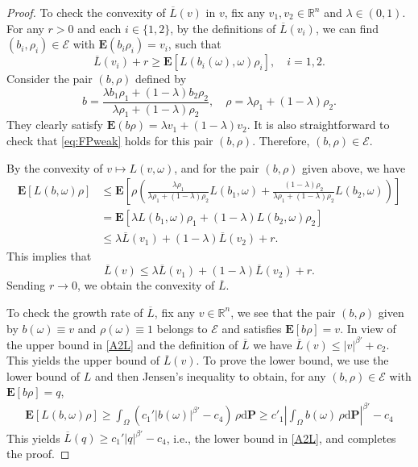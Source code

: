 \documentclass[11pt,reqno]{amsart}
\theoremstyle{definition}
\theoremstyle{remark}
\numberwithin{equation}{section}
\newcommand{\R}{{\mathbb{R}}}
\newcommand{\ol}{\overline}
\begin{document}
\begin{proof} To check the convexity of $\overline{L}(v)$ in $v$, fix any $v_1,v_2\in \R^n$ and $\lambda\in (0,1)$. For any $r>0$ and each $i\in \{1,2\}$, by the definitions of $\ol{L}(v_i)$, we can find $(b_i,\rho_i) \in \mathscr{E}$ with $\mathbf{E}(b_i\rho_i) = v_i$, such that
\begin{equation*}
    \overline{L}(v_i) + r\ge \mathbf{E}[L(b_i(\omega),\omega)\rho_i], \quad i=1,2.
\end{equation*}
Consider the pair $(b,\rho)$ defined by
\begin{equation*}
b=\frac{\lambda b_1\rho_1 + (1-\lambda) b_2\rho_2}{\lambda \rho_1 + (1-\lambda)\rho_2}, \quad \rho = \lambda \rho_1 + (1-\lambda) \rho_2.
\end{equation*}
They clearly satisfy $\mathbf{E}(b\rho) = \lambda v_1 + (1-\lambda) v_2$. It is also straightforward to check that \eqref{eq:FPweak} holds for this pair $(b,\rho)$. Therefore, $(b,\rho) \in \mathscr{E}$.

By the convexity of $v\mapsto L(v,\omega)$, and for the pair $(b,\rho)$ given above, we have
\begin{equation*}
    \begin{aligned}
    \mathbf{E}[L(b,\omega)\rho] &\le \mathbf{E}\left[\rho\left(\frac{\lambda \rho_1}{\lambda \rho_1 + (1-\lambda)\rho_2}L(b_1,\omega) + \frac{(1-\lambda) \rho_2}{\lambda \rho_1 + (1-\lambda)\rho_2}L(b_2,\omega)\right)\right]\\
    &=\mathbf{E}[\lambda L(b_1,\omega)\rho_1 + (1-\lambda) L(b_2,\omega)\rho_2]\\
    &\le \lambda \overline{L}(v_1) + (1-\lambda) \overline{L}(v_2) + r.
    \end{aligned}
\end{equation*}
This implies that
\begin{equation*}
    \ol{L}(v) \le \lambda \ol{L}(v_1) + (1-\lambda)\ol{L}(v_2) + r.
\end{equation*}
Sending $r\to 0$, we obtain the convexity of $\overline{L}$.

To check the growth rate of $\ol{L}$, fix any $v\in \R^n$, we see that the pair $(b,\rho)$ given by $b(\omega)\equiv v$ and $\rho(\omega)\equiv 1$ belongs to $\mathscr{E}$ and satisfies $\mathbf{E}[b\rho] = v$. In view of the upper bound in \eqref{A2L} and the definition of $\ol{L}$ we have $\overline{L}(v)\le |v|^{\beta'} + c_2$. This yields the upper bound of $\ol{L}(v)$. To prove the lower bound, we use the lower bound of $L$ and then Jensen's inequality to obtain, for any $(b,\rho)\in \mathscr{E}$ with $\mathbf{E}[b\rho]=q$,
\begin{equation*}
\begin{aligned}
\mathbf{E}[L(b,\omega)\rho] \ge \int_\Omega \left(c_1'|b(\omega)|^{\beta'}-c_4\right)\,\rho \mathrm{d}\mathbf{P} \ge c'_1\left|\int_\Omega b(\omega)\,\rho \mathrm{d}\mathbf{P}\right|^{\beta'} -c_4
\end{aligned}
\end{equation*}
This yields $\overline{L}(q)\ge c_1'|q|^{\beta'}-c_4$, i.e., the lower bound in \eqref{A2L}, and completes the proof.
\end{proof}
\end{document}
